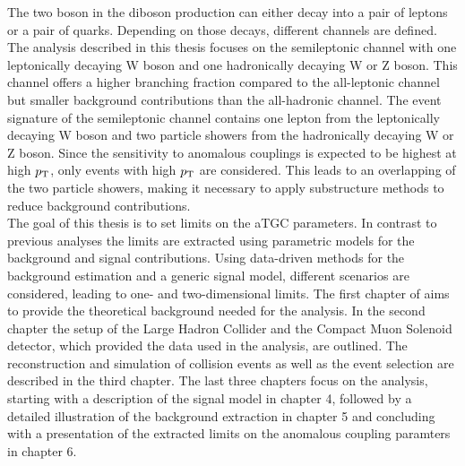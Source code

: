 The two boson in the diboson production can either decay into a pair of leptons or a pair of quarks. Depending on those decays, different channels are defined. The analysis described in this thesis focuses on the semileptonic channel with one leptonically decaying W boson and one hadronically decaying W or Z boson. This channel offers a higher branching fraction compared to the all-leptonic channel but smaller background contributions than the all-hadronic channel. The event signature of the semileptonic channel contains one lepton from the leptonically decaying W boson and two particle showers from the hadronically decaying W or Z boson. Since the sensitivity to anomalous couplings is expected to be highest at high $p_{\rm T}$, only events with high $p_{\rm T}$ are considered. This leads to an overlapping of the two particle showers, making it necessary to apply substructure methods to reduce background contributions. \\

The goal of this thesis is to set limits on the aTGC parameters. In contrast to previous analyses the limits are extracted using parametric models for the background and signal contributions. Using data-driven methods for the background estimation and a generic signal model, different scenarios are considered, leading to one- and two-dimensional limits. The first chapter of aims to provide the theoretical background needed for the analysis. In the second chapter the setup of the Large Hadron Collider and the Compact Muon Solenoid detector, which provided the data used in the analysis, are outlined. The reconstruction and simulation of collision events as well as the event selection are described in the third chapter. The last three chapters focus on the analysis, starting with a description of the signal model in chapter 4, followed by a detailed illustration of the background extraction in chapter 5 and concluding with a presentation of the extracted limits on the anomalous coupling paramters in chapter 6.





